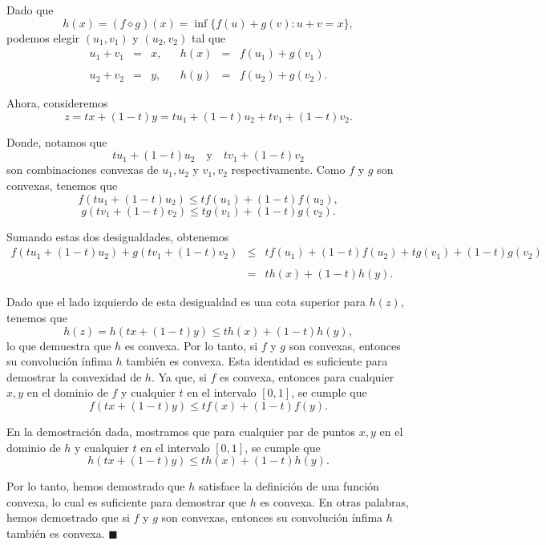 \begin{enumerate}
	Dado que 
	$$h(x) = (f \diamond g)(x) = \inf\{f(u) + g(v) : u + v = x\},$$ 
	podemos elegir $(u_1, v_1)$ y $(u_2, v_2)$ tal que 
	$$
	\begin{array}{rclcrcl}
	    u_1 + v_1 &=& x, & & h(x) &=& f(u_1) + g(v_1)\\\\
	    u_2 + v_2 &=& y, & & h(y) &=& f(u_2) + g(v_2).
	\end{array}
	$$

	Ahora, consideremos 
	$$z = tx + (1-t)y = tu_1 + (1-t)u_2 + tv_1 + (1-t)v_2.$$ 

	Donde, notamos que 
	$$tu_1 + (1-t)u_2 \quad \text{y}\quad tv_1 + (1-t)v_2$$ 
	son combinaciones convexas de $u_1, u_2$ y $v_1, v_2$ respectivamente. Como $f$ y $g$ son convexas, tenemos que
	$$f(tu_1 + (1-t)u_2) \leq t f(u_1) + (1-t) f(u_2),$$
	$$g(tv_1 + (1-t)v_2) \leq t g(v_1) + (1-t) g(v_2).$$

	Sumando estas dos desigualdades, obtenemos
	$$
	\begin{array}{rcl}
	    f(tu_1 + (1-t)u_2) + g(tv_1 + (1-t)v_2) &\leq& t f(u_1) + (1-t) f(u_2) + t g(v_1) + (1-t) g(v_2)\\\\
						    &=& t h(x) + (1-t) h(y).
	\end{array}
	$$

	Dado que el lado izquierdo de esta desigualdad es una cota superior para $h(z)$, tenemos que
	$$h(z) = h(tx + (1-t)y) \leq t h(x) + (1-t) h(y),$$
	lo que demuestra que $h$ es convexa. Por lo tanto, si $f$ y $g$ son convexas, entonces su convolución ínfima $h$ también es convexa. Esta identidad es suficiente para demostrar la convexidad de $h$. Ya que, si $f$ es convexa, entonces para cualquier $x, y$ en el dominio de $f$ y cualquier $t$ en el intervalo $[0,1]$, se cumple que
	$$f(tx + (1-t)y) \leq t f(x) + (1-t) f(y).$$

	En la demostración dada, mostramos que para cualquier par de puntos $x, y$ en el dominio de $h$ y cualquier $t$ en el intervalo $[0,1]$, se cumple que
	$$h(tx + (1-t)y) \leq t h(x) + (1-t) h(y).$$

	Por lo tanto, hemos demostrado que $h$ satisface la definición de una función convexa, lo cual es suficiente para demostrar que $h$ es convexa. En otras palabras, hemos demostrado que si $f$ y $g$ son convexas, entonces su convolución ínfima $h$ también es convexa. $\blacksquare$ \\\\



\end{enumerate}

